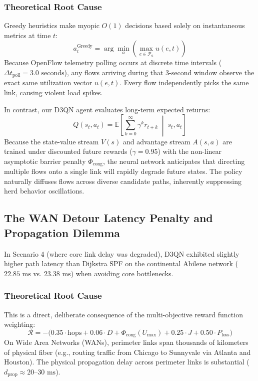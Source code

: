 \documentclass[12pt,a4paper,oneside]{report}
\begin{document}
\subsubsection{Theoretical Root Cause}
Greedy heuristics make myopic $O(1)$ decisions based solely on instantaneous metrics at time $t$:
\begin{equation}
    a_t^{\text{Greedy}} = \arg\min_a \left( \max_{e \in \mathcal{P}_a} u(e, t) \right)
\end{equation}
Because OpenFlow telemetry polling occurs at discrete time intervals ($\Delta t_{\text{poll}} = 3.0\text{ seconds}$), any flows arriving during that 3-second window observe the exact same utilization vector $u(e, t)$. Every flow independently picks the same link, causing violent load spikes.

In contrast, our D3QN agent evaluates long-term expected returns:
\begin{equation}
    Q(s_t, a_t) = \mathbb{E}\left[ \sum_{k=0}^\infty \gamma^k r_{t+k} \;\middle|\; s_t, a_t \right]
\end{equation}
Because the state-value stream $V(s)$ and advantage stream $A(s, a)$ are trained under discounted future rewards ($\gamma = 0.95$) with the non-linear asymptotic barrier penalty $\Phi_{\text{cong}}$, the neural network anticipates that directing multiple flows onto a single link will rapidly degrade future states. The policy naturally diffuses flows across diverse candidate paths, inherently suppressing herd behavior oscillations.

\subsection{The WAN Detour Latency Penalty and Propagation Dilemma}
In Scenario 4 (where core link delay was degraded), D3QN exhibited slightly higher path latency than Dijkstra SPF on the continental Abilene network ($22.85\text{ ms}$ vs. $23.38\text{ ms}$) when avoiding core bottlenecks.

\subsubsection{Theoretical Root Cause}
This is a direct, deliberate consequence of the multi-objective reward function weighting:
\begin{equation}
    \mathcal{R} = - \Big( 0.35 \cdot \text{hops} + 0.06 \cdot D + \Phi_{\text{cong}}(U_{\max}) + 0.25 \cdot J + 0.50 \cdot P_{\text{loss}} \Big)
\end{equation}
On Wide Area Networks (WANs), perimeter links span thousands of kilometers of physical fiber (e.g., routing traffic from Chicago to Sunnyvale via Atlanta and Houston). The physical propagation delay across perimeter links is substantial ($d_{\text{prop}} \approx 20\text{--}30\text{ ms}$).
\end{document}
